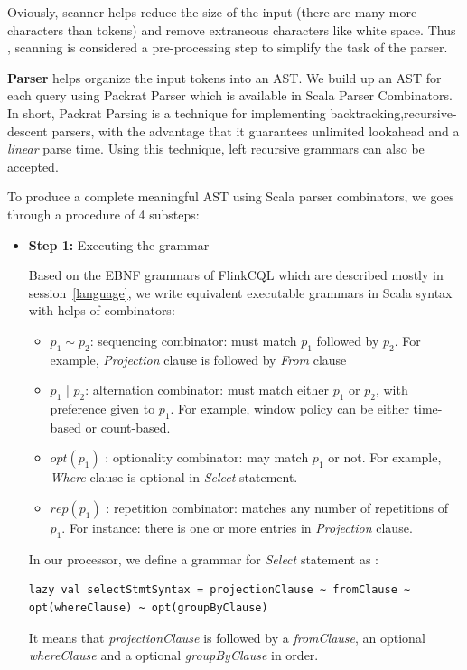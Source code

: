 Oviously, scanner helps reduce the size of the input (there are many more characters than tokens) and remove extraneous characters like white space. Thus  , scanning is considered a pre-processing step to simplify the task of the parser.

\textbf{Parser} helps organize the input tokens into an AST. We build up an AST for each query using Packrat Parser which is available in Scala Parser Combinators. 
In short, Packrat Parsing is a technique for implementing backtracking,recursive-descent parsers, with the advantage that it guarantees unlimited lookahead and a \textit{linear} parse time. Using this technique, left recursive grammars can also be accepted.

To produce a complete meaningful AST using Scala parser combinators, we goes through a procedure of 4 substeps:
\begin{itemize}

\item \textbf{Step 1:} Executing the grammar

Based on the EBNF grammars of FlinkCQL which are described mostly in session~\ref{language}, we write equivalent executable grammars in Scala syntax with helps of combinators:
\begin{itemize}
	\item $p_1 \sim p_2$: sequencing combinator: must match $p_1$ followed by $p_2$. For example, \textit{Projection} clause is followed by \textit{From} clause
	\item $p_1$ | $p_2$: alternation combinator: must match either $p_1$ or $p_2$, with preference given to $p_1$. For example, window policy can be either time-based or count-based.
	\item $opt(p_1)$ : optionality combinator: may match $p_1$ or not. For example, \textit{Where} clause is optional in \textit{Select} statement.
	\item $rep(p_1)$ : repetition combinator: matches any number of repetitions of $p_1$. For instance: there is one or more entries in \textit{Projection} clause.
\end{itemize} 

In our processor, we define a grammar for \textit{Select} statement as :
\begin{lstlisting}
lazy val selectStmtSyntax = projectionClause ~ fromClause ~ opt(whereClause) ~ opt(groupByClause)
\end{lstlisting}
It means that \textit{projectionClause} is followed by a \textit{fromClause}, an optional \textit{whereClause} and a optional \textit{groupByClause} in order.


\end{itemize}
